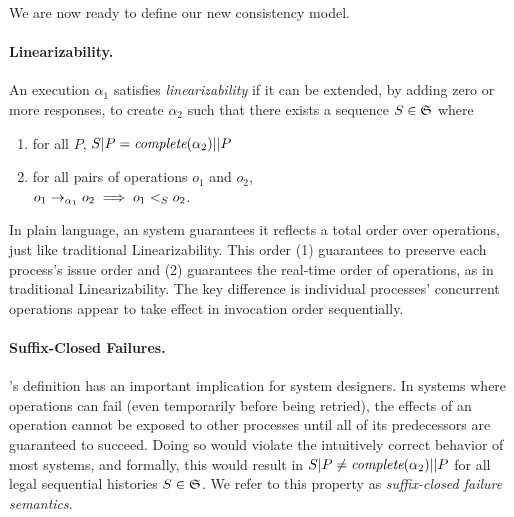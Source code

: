We are now ready to define our new consistency model.
\paragraph{\Multidispatch{} Linearizability.} An execution $\alpha_1$ satisfies \textit{\multidispatch{} linearizability} if it
can be extended, by adding zero or more responses, to create $\alpha_2$ such that
there exists a sequence $S \in \mathfrak{S}$ where 
\begin{enumerate}
    \item for all $P$,
$S|P = \operatorname*{\textit{complete}}(\alpha_2)||P$
    \item for all pairs of operations
$o_1$ and $o_2$, \\$o_1 \rightarrow_{\alpha_1} o_2 \implies o_1 <_S o_2$.
\end{enumerate}

In plain language, an \MDL{} system guarantees it reflects a total order 
over operations, just like traditional Linearizability. This order (1) guarantees to preserve each process's issue order and (2) guarantees the real-time order of operations, as in traditional Linearizability. The key difference is individual processes' concurrent operations appear to take effect in invocation order sequentially.


\paragraph{Suffix-Closed Failures.}
\label{sec:mdl:def:failures}

\MDL{}'s definition has an important implication for system designers.
In systems where operations can fail (even temporarily before being retried), the
effects of an operation cannot be exposed to other processes until all of its 
predecessors are guaranteed to succeed. Doing so would violate the intuitively
correct behavior of most systems, and formally, this would result in
$S|P \neq \operatorname*{\textit{complete}}(\alpha_2)||P$ for all legal sequential histories
$S \in \mathfrak{S}$.
We refer to this property as \textit{suffix-closed failure semantics}.


